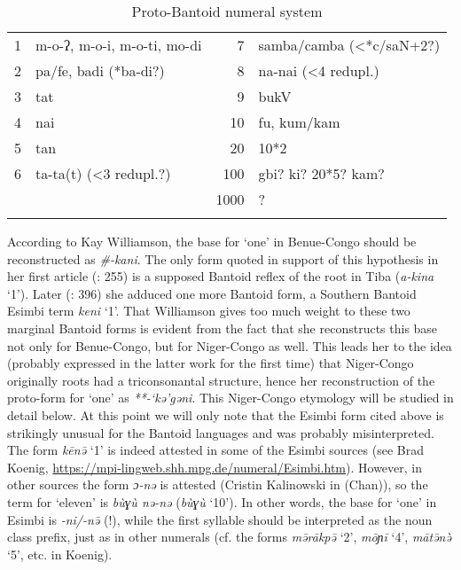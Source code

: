 \begin{table}
\caption[Proto-Bantoid numeral system]{\label{tab:3:14}Proto-Bantoid numeral system\footnotemark} 
\begin{tabularx}{\textwidth}{rX rl}
\lsptoprule
{1} & m-o-ʔ, m-o-i, m-o-ti, mo-di &  {7} & samba/camba (<*c/saN+2?)\\
{2} & pa/fe, badi (*ba-di?) &  {8} & na-nai (<4 redupl.)\\
{3} & tat &  {9} & bukV\\
{4} & nai &  {10} & fu, kum/kam\\
{5} & tan &  {20} & 10*2\\
{6} & ta-ta(t) (<3 redupl.?) &  {100} & gbi? ki? 20*5? kam?\\
&  &  {1000} & ?\\
\lspbottomrule
\end{tabularx}
\end{table}

According to Kay Williamson, the base for `one' in Benue-Congo should be reconstructed as \textit{\#-kani}. The only form quoted in support of this hypothesis in her first article (\citealt{Williamson1989b}: 255) is a supposed Bantoid reflex of the root in Tiba (\textit{a-kina} ‘1’). Later (\citealt{Williamson1992}: 396) she adduced one more Bantoid form, a Southern Bantoid Esimbi term \textit{keni} ‘1’. That Williamson gives too much weight to these two marginal Bantoid forms is evident from the fact that she reconstructs this base not only for Benue-Congo, but for Niger-Congo as well. This leads her to the idea (probably expressed in the latter work for the first time) that Niger-Congo originally roots had a triconsonantal structure, hence her reconstruction of the proto-form for ‘one’ as \textit{**-‘kə’gəni}. This Niger-Congo etymology will be studied in detail below. At this point we will only note that the Esimbi form cited above is strikingly unusual for the Bantoid languages and was probably misinterpreted. The form \textit{kēn{\={ə}}} ‘1’ is indeed attested in some of the Esimbi sources (see Brad Koenig, \url{https://mpi-lingweb.shh.mpg.de/numeral/Esimbi.htm}). However, in other sources the form \textit{ɔ-nə} is attested (Cristin Kalinowski in (Chan)), so the term for ‘eleven’ is \textit{bùɣù nə-nə} (\textit{bùɣù} ‘10’). In other words, the base for ‘one’ in Esimbi is \textit{-ni/-n{\={ə}}} (!), while the first syllable should be interpreted as the noun class prefix, just as in other numerals (cf. the forms \textit{m{\={ə}}rākp{\={ə}}} ‘2’, \textit{mōɲī} ‘4’, \textit{māt{\={ə}}n{\`{ə}}} ‘5’, etc. in Koenig). 

